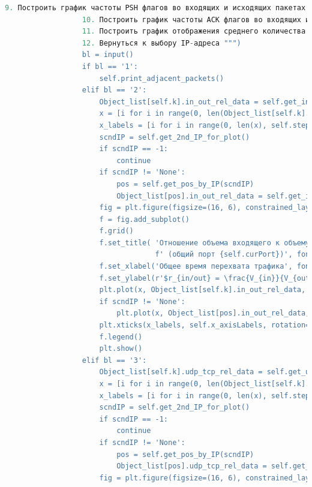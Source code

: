 \documentclass[bachelor, och, coursework]{SCWorks}
\begin{document}
\begin{lstlisting}[language=Python]
                  9. Построить график частоты PSH флагов во входящих и исходящих пакетах
                  10. Построить график частоты ACK флагов во входящих и исходящих пакетах
                  11. Построить график отображения среднего количества значения размеров окна
                  12. Вернуться к выбору IP-адреса """)
                  bl = input()
                  if bl == '1':
                      self.print_adjacent_packets()
                  elif bl == '2':
                      Object_list[self.k].in_out_rel_data = self.get_in_out_rel(self.curIP)
                      x = [i for i in range(0, len(Object_list[self.k].in_out_rel_data))]
                      x_labels = [i for i in range(0, len(x), self.step)]
                      scndIP = self.get_2nd_IP_for_plot()
                      if scndIP == -1:
                          continue
                      if scndIP != 'None':
                          pos = self.get_pos_by_IP(scndIP)
                          Object_list[pos].in_out_rel_data = self.get_in_out_rel(scndIP)
                      fig = plt.figure(figsize=(16, 6), constrained_layout=True)
                      f = fig.add_subplot()
                      f.grid()
                      f.set_title( 'Отношение объема входящего к объему исходящего трафиков' + \
                                   f' (общий порт {self.curPort})', fontsize=15 )
                      f.set_xlabel('Общее время перехвата трафика', fontsize=15)
                      f.set_ylabel(r'$r_{in/out} = \frac{V_{in}}{V_{out}}$', fontsize=15)
                      plt.plot(x, Object_list[self.k].in_out_rel_data, label=self.curIP)
                      if scndIP != 'None':
                          plt.plot(x, Object_list[pos].in_out_rel_data, label=scndIP)
                      plt.xticks(x_labels, self.x_axisLabels, rotation=30, fontsize=10)
                      f.legend()
                      plt.show()
                  elif bl == '3':
                      Object_list[self.k].udp_tcp_rel_data = self.get_udp_tcp_rel(self.curIP)
                      x = [i for i in range(0, len(Object_list[self.k].udp_tcp_rel_data))]
                      x_labels = [i for i in range(0, len(x), self.step)]
                      scndIP = self.get_2nd_IP_for_plot()
                      if scndIP == -1:
                          continue
                      if scndIP != 'None':
                          pos = self.get_pos_by_IP(scndIP)
                          Object_list[pos].udp_tcp_rel_data = self.get_udp_tcp_rel(scndIP)
                      fig = plt.figure(figsize=(16, 6), constrained_layout=True)

\end{lstlisting}
\end{document}
